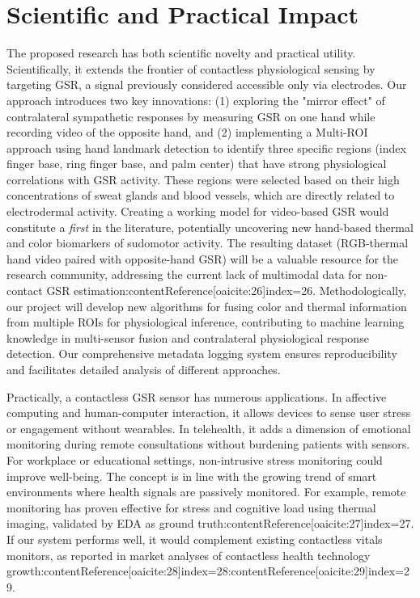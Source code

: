 \documentclass[12pt]{article}
\begin{document}
    \section{Scientific and Practical Impact}
    The proposed research has both scientific novelty and practical utility. Scientifically, it extends the frontier of contactless physiological sensing by targeting GSR, a signal previously considered accessible only via electrodes. Our approach introduces two key innovations: (1) exploring the "mirror effect" of contralateral sympathetic responses by measuring GSR on one hand while recording video of the opposite hand, and (2) implementing a Multi-ROI approach using hand landmark detection to identify three specific regions (index finger base, ring finger base, and palm center) that have strong physiological correlations with GSR activity. These regions were selected based on their high concentrations of sweat glands and blood vessels, which are directly related to electrodermal activity. Creating a working model for video-based GSR would constitute a \emph{first} in the literature, potentially uncovering new hand-based thermal and color biomarkers of sudomotor activity. The resulting dataset (RGB-thermal hand video paired with opposite-hand GSR) will be a valuable resource for the research community, addressing the current lack of multimodal data for non-contact GSR estimation:contentReference[oaicite:26]{index=26}. Methodologically, our project will develop new algorithms for fusing color and thermal information from multiple ROIs for physiological inference, contributing to machine learning knowledge in multi-sensor fusion and contralateral physiological response detection. Our comprehensive metadata logging system ensures reproducibility and facilitates detailed analysis of different approaches.

    Practically, a contactless GSR sensor has numerous applications. In affective computing and human-computer interaction, it allows devices to sense user stress or engagement without wearables. In telehealth, it adds a dimension of emotional monitoring during remote consultations without burdening patients with sensors. For workplace or educational settings, non-intrusive stress monitoring could improve well-being. The concept is in line with the growing trend of smart environments where health signals are passively monitored. For example, remote monitoring has proven effective for stress and cognitive load using thermal imaging, validated by EDA as ground truth:contentReference[oaicite:27]{index=27}. If our system performs well, it would complement existing contactless vitals monitors, as reported in market analyses of contactless health technology growth:contentReference[oaicite:28]{index=28}:contentReference[oaicite:29]{index=29}.
\end{document}
